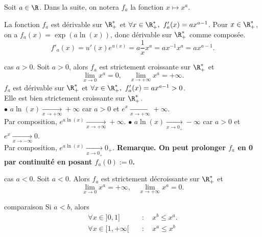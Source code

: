 \documentclass[11pt]{article}
\begin{document}
Soit $a\in\R$. Dans la suite, on notera $f_a$ la fonction $x\mapsto x^a$.

\begin{prop}{}{}
    La fonction $f_a$ est dérivable sur $\R_+^*$ et $\forall x\in\R^*_+,~f_a'(x)=ax^{a-1}$.
    \tcblower
    Pour $x\in\R_+^*$, on a $f_a(x)=\exp(a\ln(x))$, donc dérivable sur $\R_+^*$ comme composée. 
    \begin{equation*}
        f'_a(x)=u'(x)e^{u(x)}=a\frac{1}{x}x^a=ax^{-1}x^a=ax^{a-1}.
    \end{equation*}
\end{prop}

\begin{prop}{cas $a>0$.}{}
    Soit $a>0$, alors $f_a$ est strictement croissante sur $\R_+^*$ et
    \begin{equation*}
        \lim_{x\to0}x^a=0,\quad\lim_{x\to+\infty}x^a=+\infty.
    \end{equation*}
    \tcblower
    $f_a$ est dérivable sur $\R_+^*$ et $\forall x\in\R_+^*,~f_a'(x)=ax^{a-1}>0$.\\
    Elle est bien strictement croissante sur $\R_+^*$.\\
    $\bullet$ $a\ln(x)\xrightarrow[x\to+\infty]{}+\infty$ car $a>0$ et $e^x\xrightarrow[x\to+\infty]{}+\infty$.\\
    Par composition, $e^{a\ln(x)}\xrightarrow[x\to+\infty]{}+\infty$.\n
    $\bullet$ $a\ln(x)\xrightarrow[x\to0_+]{}-\infty$ car $a>0$ et $e^x\xrightarrow[x\to-\infty]{}0$.\\
    Par composition, $e^{a\ln(x)}\xrightarrow[x\to0_+]{}0_+$.\n
    \bf{Remarque.} On peut prolonger $f_a$ en 0 par continuité en posant $f_a(0):=0$.
\end{prop}

\begin{prop}{cas $a<0$.}{}
    Soit $a<0$. Alors $f_a$ est strictement décroissante sur $\R_+^*$ et
    \begin{equation*}
        \lim_{x\to0}x^a=+\infty,\quad\lim_{x\to+\infty}x^a=0.
    \end{equation*}
\end{prop}

\begin{prop}{comparaison}{}
    Si $a<b$, alors
    \begin{align*}
        \forall x\in]0,1]\quad&:\quad x^b\leq x^a.\\
        \forall x\in[1,+\infty[\quad&:\quad x^a\leq x^b
    \end{align*}
\end{prop}
\end{document}
